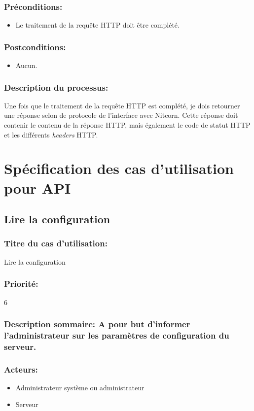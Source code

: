 \documentclass{scrreprt}
\begin{document}
\subsubsection{Préconditions:}
\begin{itemize}
	\item Le traitement de la requête HTTP doit être complété.
\end{itemize}

\subsubsection{Postconditions:}
\begin{itemize}
	\item Aucun.
\end{itemize}

\subsubsection{Description du processus:}
Une fois que le traitement de la requête HTTP est complété, je dois retourner une 
réponse selon de protocole de l'interface avec Nitcorn. Cette réponse doit
contenir le contenu de la réponse HTTP, mais également le code de statut HTTP
et les différents \textit{headers} HTTP.

\section{Spécification des cas d'utilisation pour API}
\subsection{Lire la configuration}
\subsubsection{Titre du cas d'utilisation:} Lire la configuration
\subsubsection{Priorité:} 6
\subsubsection{Description sommaire: A pour but d'informer l'administrateur sur les paramètres de  configuration du serveur.}
\subsubsection{Acteurs:}
\begin{itemize}
	\item Administrateur système ou administrateur
    \item Serveur
\end{itemize}
\end{document}
